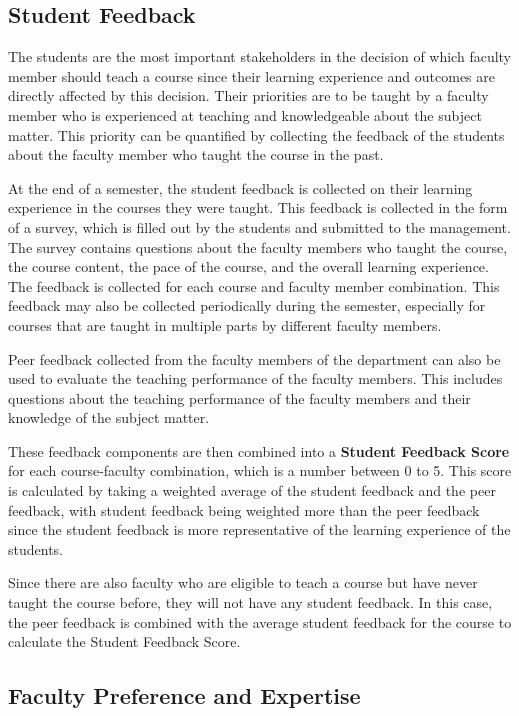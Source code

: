 \subsection{Student Feedback}

The students are the most important stakeholders in the decision of which faculty member should teach a course since their learning experience and outcomes are directly affected by this decision. Their priorities are to be taught by a faculty member who is experienced at teaching and knowledgeable about the subject matter. This priority can be quantified by collecting the feedback of the students about the faculty member who taught the course in the past.

At the end of a semester, the student feedback is collected on their learning experience in the courses they were taught. This feedback is collected in the form of a survey, which is filled out by the students and submitted to the management. The survey contains questions about the faculty members who taught the course, the course content, the pace of the course, and the overall learning experience. The feedback is collected for each course and faculty member combination. This feedback may also be collected periodically during the semester, especially for courses that are taught in multiple parts by different faculty members.

Peer feedback collected from the faculty members of the department can also be used to evaluate the teaching performance of the faculty members. This includes questions about the teaching performance of the faculty members and their knowledge of the subject matter.

These feedback components are then combined into a \textbf{Student Feedback Score} for each course-faculty combination, which is a number between 0 to 5. This score is calculated by taking a weighted average of the student feedback and the peer feedback, with student feedback being weighted more than the peer feedback since the student feedback is more representative of the learning experience of the students.

Since there are also faculty who are eligible to teach a course but have never taught the course before, they will not have any student feedback. In this case, the peer feedback is combined with the average student feedback for the course to calculate the Student Feedback Score.

\subsection{Faculty Preference and Expertise}

